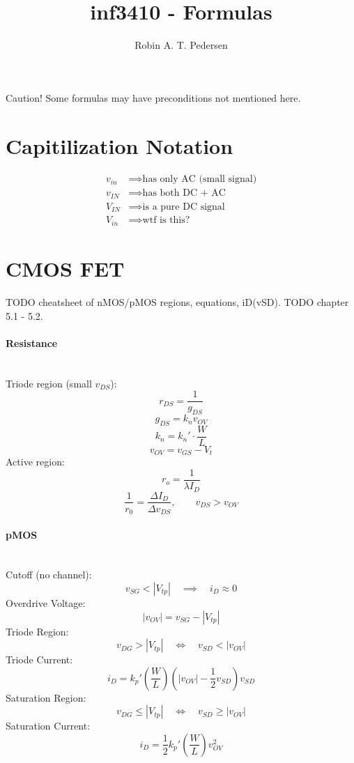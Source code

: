 \documentclass[twocolumn]{article}
\begin{document}
  \title{inf3410 - Formulas}
  \author{Robin A. T. Pedersen}
  \maketitle

  Caution! Some formulas may have preconditions not mentioned here.

  \section{Capitilization Notation}
    \begin{align}
      v_{in} &\implies \text{has only AC (small signal)} \\
      v_{IN} &\implies \text{has both DC + AC} \\
      V_{IN} &\implies \text{is a pure DC signal} \\
      V_{in} &\implies \text{wtf is this?}
    \end{align}
  \section{CMOS FET}
    TODO cheatsheet of nMOS/pMOS regions, equations, iD(vSD).
    TODO chapter 5.1 - 5.2.

    \paragraph{Resistance} \hfill \\
      Triode region (small $v_{DS}$):
        $$r_{DS} = \frac{1}{g_{DS}}$$
        $$g_{DS} = k_n v_{OV}$$
        $$k_n = k_n' \cdot \frac{W}{L}$$
        $$v_{OV} = v_{GS} - V_t$$
      Active region:
        $$r_o = \frac{1}{\lambda I_D}$$
        $$\frac{1}{r_0} = \frac{\Delta I_D}{\Delta v_{DS}},
          \qquad v_{DS} > v_{OV}$$

    \paragraph{pMOS} \hfill \\
      Cutoff (no channel):
        $$v_{SG} < |V_{tp}| \quad\implies\quad i_D \approx 0$$
      Overdrive Voltage:
        $$|v_{OV}| = v_{SG} - |V_{tp}|$$
      Triode Region:
        $$v_{DG} > |V_{tp}| \quad\Leftrightarrow\quad v_{SD} < |v_{OV}|$$
      Triode Current:
        $$i_D = k_p' \left( \frac{W}{L} \right)
                     \left( |v_{OV}| - \frac{1}{2} v_{SD} \right) v_{SD}$$
      Saturation Region:
        $$v_{DG} \leq |V_{tp}| \quad\Leftrightarrow\quad v_{SD} \geq |v_{OV}|$$
      Saturation Current:
        $$i_D = \frac{1}{2} k_p' \left( \frac{W}{L} \right) v_{OV}^2$$
\end{document}
